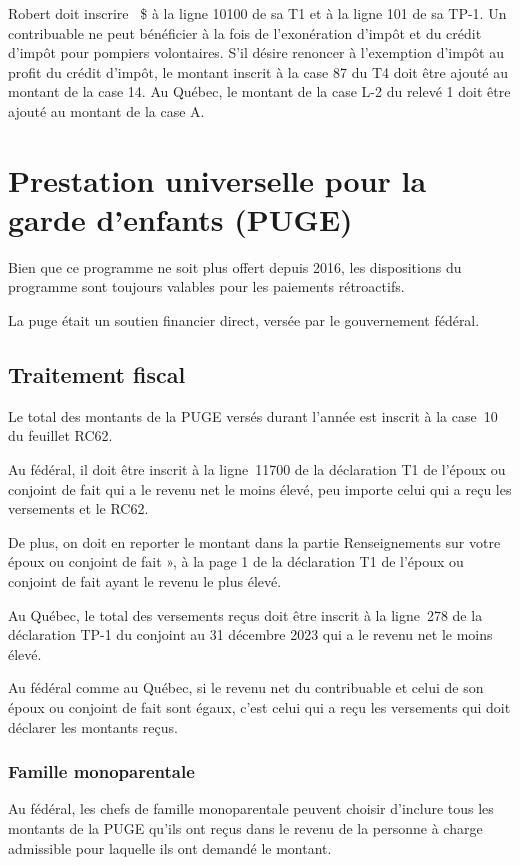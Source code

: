 Robert doit inscrire ~\$ à la ligne 10100 de sa T1 et à la ligne 101 de sa TP-1. Un contribuable ne peut bénéficier à la fois de l'exonération d'impôt et du crédit d'impôt pour pompiers volontaires. S'il désire renoncer à l'exemption d'impôt au profit du crédit d'impôt, le montant inscrit à la case 87 du T4 doit être ajouté au montant de la case 14. Au Québec, le montant de la case L-2 du relevé 1 doit être ajouté au montant de la case A.



\section{Prestation universelle pour la garde d'enfants (PUGE)}
\begin{intro}
	Bien que ce programme ne soit plus offert depuis 2016, les dispositions du programme sont toujours valables pour les paiements rétroactifs.
\end{intro}
La \acrfull{puge} était un soutien financier direct, versée par le gouvernement fédéral.


\subsection{Traitement fiscal}
Le total des montants de la PUGE versés durant l'année est inscrit à la case~10 du feuillet RC62. 

Au fédéral, il doit être inscrit à la ligne~11700 de la déclaration T1 de l'époux ou conjoint de fait qui a le revenu net le moins élevé, peu importe celui qui a reçu les versements et le RC62. 

De plus, on doit en reporter le montant dans la partie \og Renseignements sur votre époux ou conjoint de fait », à la page 1 de la déclaration T1 de l'époux ou conjoint de fait ayant le revenu le plus élevé.

Au Québec, le total des versements reçus doit être inscrit à la ligne~278 de la déclaration TP-1 du conjoint au 31 décembre 2023 qui a le revenu net le moins élevé.

Au fédéral comme au Québec, si le revenu net du contribuable et celui de son époux ou conjoint de fait sont égaux, c'est celui qui a reçu les versements qui doit déclarer les montants reçus.

\subsubsection{Famille monoparentale}
Au fédéral, les chefs de famille monoparentale peuvent choisir d'inclure tous les montants de la PUGE qu'ils ont reçus dans le revenu de la personne à charge admissible pour laquelle ils ont demandé le montant.

